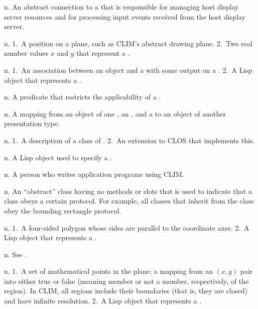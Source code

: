 \begin{description}
 {n.} {An abstract connection to a 
that is responsible for managing host display server resources and for
processing input events received from the host display server.}

 {n.} {1.~A position on a plane, such as CLIM's
abstract drawing plane.  2.~Two real number values $x$ and $y$ that represent a
.}

 {n.} {1.~An association between an object and a
 with some output on a .
2.~A Lisp object that represents a .}

 {n.} {A predicate that restricts the
applicability of a .}

 {n.} {A mapping from an object of one
, an , and a  to an
object of another presentation type.}

 {n.} {1.~A description of a class of
.  2.~An extension to CLOS that implements this.}

 {n.} {A Lisp object used to specify
a .}

 {n.} {A person who writes application programs using
CLIM.}

 {n.} {An ``abstract'' class having no methods or
slots that is used to indicate that a class obeys a certain protocol.  For
example, all classes that inherit from the  class obey
the bounding rectangle protocol.}

 {n.} {1.~A four-sided polygon whose sides are
parallel to the coordinate axes.  2.~A Lisp object that represents a
.}

 {n.} {See .}

 {n.} {1.~A set of mathematical points in the plane; a
mapping from an $(x,y)$ pair into either true or false (meaning member or not a
member, respectively, of the region).  In CLIM, all regions include their
boundaries (that is, they are closed) and have infinite resolution.  2.~A Lisp
object that represents a .}


\end{description}
